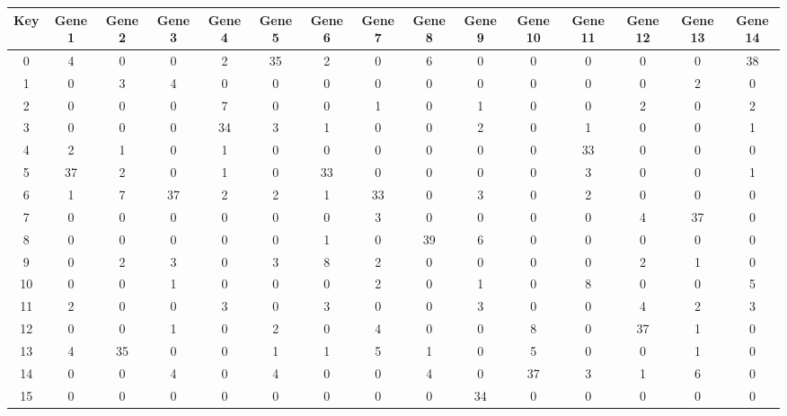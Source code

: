 \begin{tabular}{|c|c|c|c|c|c|c|c|c|c|c|c|c|c|c|}
\hline
Key & Gene 1 & Gene 2 & Gene 3 & Gene 4 & Gene 5 & Gene 6 & Gene 7 & Gene 8 & Gene 9 & Gene 10 & Gene 11 & Gene 12 & Gene 13 & Gene 14 \\
\hline
0 & 4 & 0 & 0 & 2 & 35 & 2 & 0 & 6 & 0 & 0 & 0 & 0 & 0 & 38 \\
1 & 0 & 3 & 4 & 0 & 0 & 0 & 0 & 0 & 0 & 0 & 0 & 0 & 2 & 0 \\
2 & 0 & 0 & 0 & 7 & 0 & 0 & 1 & 0 & 1 & 0 & 0 & 2 & 0 & 2 \\
3 & 0 & 0 & 0 & 34 & 3 & 1 & 0 & 0 & 2 & 0 & 1 & 0 & 0 & 1 \\
4 & 2 & 1 & 0 & 1 & 0 & 0 & 0 & 0 & 0 & 0 & 33 & 0 & 0 & 0 \\
5 & 37 & 2 & 0 & 1 & 0 & 33 & 0 & 0 & 0 & 0 & 3 & 0 & 0 & 1 \\
6 & 1 & 7 & 37 & 2 & 2 & 1 & 33 & 0 & 3 & 0 & 2 & 0 & 0 & 0 \\
7 & 0 & 0 & 0 & 0 & 0 & 0 & 3 & 0 & 0 & 0 & 0 & 4 & 37 & 0 \\
8 & 0 & 0 & 0 & 0 & 0 & 1 & 0 & 39 & 6 & 0 & 0 & 0 & 0 & 0 \\
9 & 0 & 2 & 3 & 0 & 3 & 8 & 2 & 0 & 0 & 0 & 0 & 2 & 1 & 0 \\
10 & 0 & 0 & 1 & 0 & 0 & 0 & 2 & 0 & 1 & 0 & 8 & 0 & 0 & 5 \\
11 & 2 & 0 & 0 & 3 & 0 & 3 & 0 & 0 & 3 & 0 & 0 & 4 & 2 & 3 \\
12 & 0 & 0 & 1 & 0 & 2 & 0 & 4 & 0 & 0 & 8 & 0 & 37 & 1 & 0 \\
13 & 4 & 35 & 0 & 0 & 1 & 1 & 5 & 1 & 0 & 5 & 0 & 0 & 1 & 0 \\
14 & 0 & 0 & 4 & 0 & 4 & 0 & 0 & 4 & 0 & 37 & 3 & 1 & 6 & 0 \\
15 & 0 & 0 & 0 & 0 & 0 & 0 & 0 & 0 & 34 & 0 & 0 & 0 & 0 & 0 \\
\hline
\end{tabular}